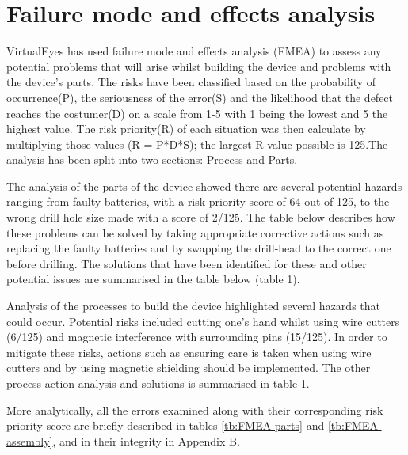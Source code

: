 \section{Failure mode and effects analysis}
VirtualEyes has used failure mode and effects analysis (FMEA) to assess any potential problems that will arise whilst building the device and problems with the device's parts. The risks have been classified based on the probability of occurrence(P), the seriousness of the error(S) and the likelihood that the defect reaches the costumer(D) on a scale from 1-5 with 1 being the lowest and 5 the highest value. The risk priority(R) of each situation was then calculate by multiplying those values (R = P*D*S); the largest R value possible is 125.The analysis has been split into two sections: Process and Parts. 

The analysis of the parts of the device showed there are several potential hazards ranging from faulty batteries, with a risk priority score of 64 out of 125, to the wrong drill hole size made with a score of 2/125. The table below describes how these problems can be solved by taking appropriate corrective actions such as replacing the faulty batteries and by swapping the drill-head to the correct one before drilling. The solutions that have been identified for these and other potential issues are summarised in the table below (table 1). 

Analysis of the processes to build the device highlighted several hazards that could occur. Potential risks included cutting one's hand whilst using wire cutters (6/125) and magnetic interference with surrounding pins (15/125). In order to mitigate these risks, actions such as ensuring care is taken when using wire cutters and by using magnetic shielding should be implemented. The other process action analysis and solutions is summarised in table 1. 

More analytically, all the errors examined along with their corresponding risk priority score are briefly described in tables \ref{tb:FMEA-parts} and \ref{tb:FMEA-assembly}, and in their integrity in Appendix B.

